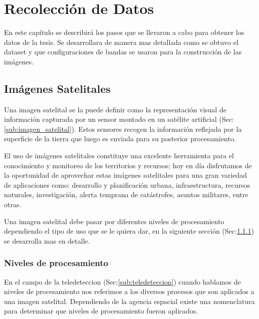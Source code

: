 \chapter{Recolección de Datos}\label{chap:recoleccion}

En este capítulo se describirá  los pasos que se llevaron a cabo para obtener los datos de la tesis. Se  desarrollara de manera mas detallada como se obtuvo el dataset y que configuraciones de bandas se usaron para la construcción de las imágenes.


\section{Imágenes Satelitales}

Una imagen satelital se la puede definir como la representación visual de información capturada por un sensor montado en un satélite artificial (Sec:\ref{sub:imagen_satelital}). Estos sensores recogen la información reflejada por la superficie de la tierra que luego es enviada para su posterior procesamiento.

El uso de imágenes satelitales constituye una excelente herramienta para el conocimiento y monitoreo de los territorios y recursos; hoy en día disfrutamos de la oportunidad de aprovechar estas imágenes satelitales para una gran variedad de aplicaciones como: desarrollo y planificación urbana, infraestructura, recursos naturales, investigación, alerta temprana de catástrofes, asuntos militares, entre otras.

Una imagen satelital debe pasar por diferentes niveles de procesamiento dependiendo el tipo de uso que se le quiera dar, en la siguiente sección (Sec:\ref{sub:nivelesdeprocesamiento}) se desarrolla mas en detalle.

\subsection{Niveles de procesamiento}\label{sub:nivelesdeprocesamiento}

En el campo de la teledeteccion (Sec:\ref{sub:teledeteccion}) cuando hablamos de niveles de procesamiento nos referimos a los diversos procesos que son aplicados a una imagen satelital. Dependiendo de la agencia espacial existe una nomenclatura para determinar que niveles de procesamiento fueron aplicados.

